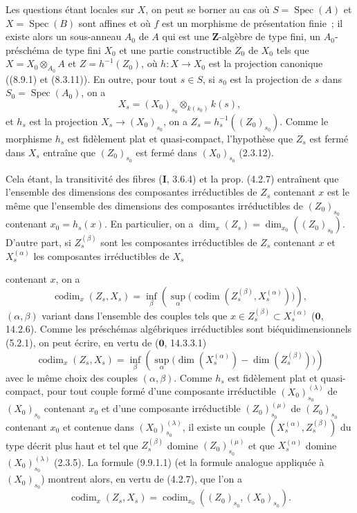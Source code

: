 Les questions étant locales sur $X$, on peut se borner au cas où
$S=\operatorname{Spec}(A)$ et $X=\operatorname{Spec}(B)$ sont affines et où
$f$ est un morphisme de présentation finie~; il existe alors un sous-anneau
$A_0$ de $A$ qui est une $\mathbf Z$-algèbre de type fini, un
$A_0$-préschéma de type fini $X_0$ et une partie constructible $Z_0$ de $X_0$
tels que $X=X_0\otimes_{A_0}A$ et $Z=h^{-1}(Z_0)$, où $h:X\to X_0$ est la
projection canonique ((8.9.1) et (8.3.11)). En outre, pour tout $s\in S$, si
$s_0$ est la projection de $s$ dans $S_0=\operatorname{Spec}(A_0)$, on a
\[
X_s=(X_0)_{s_0}\otimes_{k(s_0)}k(s),
\]
et $h_s$ est la projection $X_s\to(X_0)_{s_0}$, on a
$Z_s=h_s^{-1}((Z_0)_{s_0})$. Comme le morphisme $h_s$ est fidèlement plat et
quasi-compact, l'hypothèse que $Z_s$ est fermé dans $X_s$ entraîne que
$(Z_0)_{s_0}$ est fermé dans $(X_0)_{s_0}$ (2.3.12).

Cela étant, la transitivité des fibres (\textbf{I}, 3.6.4) et la prop. (4.2.7)
entraînent que l'ensemble des dimensions des composantes irréductibles de
$Z_s$ contenant $x$ est le même que l'ensemble des dimensions des composantes
irréductibles de $(Z_0)_{s_0}$ contenant $x_0=h_s(x)$. En particulier, on a
$\dim_x(Z_s)=\dim_{x_0}((Z_0)_{s_0})$. D'autre part, si $Z_s^{(\beta)}$ sont les
composantes irréductibles de $Z_s$ contenant $x$ et $X_s^{(\alpha)}$ les
composantes irréductibles de $X_s$


contenant $x$, on a
\[
\operatorname{codim}_x(Z_s,X_s)=
\inf_\beta\left(\sup_\alpha
\bigl(\operatorname{codim}(Z_s^{(\beta)},X_s^{(\alpha)})\bigr)\right),
\]
$(\alpha,\beta)$ variant dans l'ensemble des couples tels que
$x\in Z_s^{(\beta)}\subset X_s^{(\alpha)}$ ($\mathbf 0$, 14.2.6). Comme les
préschémas algébriques irréductibles sont biéquidimensionnels (5.2.1), on peut
écrire, en vertu de ($\mathbf 0$, 14.3.3.1)
\begin{equation}
\tag{9.9.1.1}
\label{IV.9.9.1.1-fr}
\operatorname{codim}_x(Z_s,X_s)=
\inf_\beta\left(\sup_\alpha
\bigl(\dim(X_s^{(\alpha)})-\dim(Z_s^{(\beta)})\bigr)\right)
\end{equation}
avec le même choix des couples $(\alpha,\beta)$. Comme $h_s$ est fidèlement
plat et quasi-compact, pour tout couple formé d'une composante irréductible
$(X_0)_{s_0}^{(\lambda)}$ de $(X_0)_{s_0}$ contenant $x_0$ et d'une composante
irréductible $(Z_0)_{s_0}^{(\mu)}$ de $(Z_0)_{s_0}$ contenant $x_0$ et contenue
dans $(X_0)_{s_0}^{(\lambda)}$, il existe un couple
$(X_s^{(\alpha)},Z_s^{(\beta)})$ du type décrit plus haut et tel que
$Z_s^{(\beta)}$ domine $(Z_0)_{s_0}^{(\mu)}$ et que $X_s^{(\alpha)}$ domine
$(X_0)_{s_0}^{(\lambda)}$ (2.3.5). La formule (9.9.1.1) (et la formule analogue
appliquée à $(X_0)_{s_0}$) montrent alors, en vertu de (4.2.7), que l'on a
\[
\operatorname{codim}_x(Z_s,X_s)=
\operatorname{codim}_{x_0}((Z_0)_{s_0},(X_0)_{s_0}).
\]

